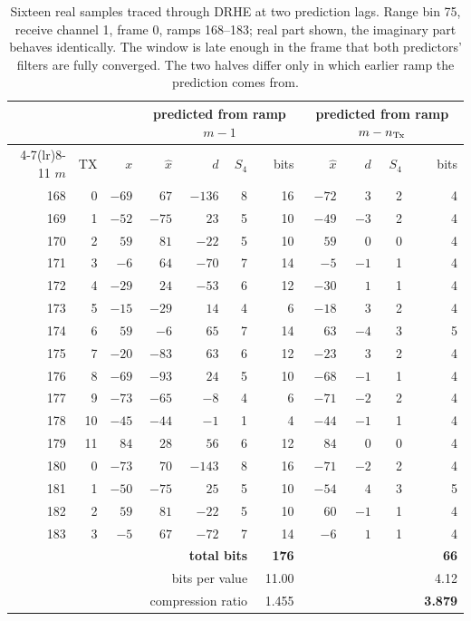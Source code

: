 \begin{table}[htbp]
\centering
\caption[Sixteen samples traced through both predictors]{Sixteen real samples
traced through DRHE at two prediction lags. Range bin 75, receive channel 1,
frame 0, ramps 168--183; real part shown, the imaginary part behaves
identically. The window is late enough in the frame that both predictors'
filters are fully converged. The two halves differ only in which earlier ramp
the prediction comes from.}
\label{tab:worked16}
\small
\setlength{\tabcolsep}{4pt}
\begin{tabular}{@{}rr r@{\hskip 10pt} rrrr @{\hskip 10pt} rrrr@{}}
\toprule
& & & \multicolumn{4}{c}{\textbf{predicted from ramp $m-1$}}
    & \multicolumn{4}{c}{\textbf{predicted from ramp $m-n_{\mathrm{Tx}}$}}\\
\cmidrule(lr){4-7}\cmidrule(lr){8-11}
$m$ & TX & $x$ & $\hat{x}$ & $d$ & $S_4$ & bits & $\hat{x}$ & $d$ & $S_4$ & bits\\
\midrule
168 & 0  & $-69$ & $67$  & $-136$ & 8 & 16 & $-72$ & $3$  & 2 & 4\\
169 & 1  & $-52$ & $-75$ & $23$   & 5 & 10 & $-49$ & $-3$ & 2 & 4\\
170 & 2  & $59$  & $81$  & $-22$  & 5 & 10 & $59$  & $0$  & 0 & 4\\
171 & 3  & $-6$  & $64$  & $-70$  & 7 & 14 & $-5$  & $-1$ & 1 & 4\\
172 & 4  & $-29$ & $24$  & $-53$  & 6 & 12 & $-30$ & $1$  & 1 & 4\\
173 & 5  & $-15$ & $-29$ & $14$   & 4 & 6  & $-18$ & $3$  & 2 & 4\\
174 & 6  & $59$  & $-6$  & $65$   & 7 & 14 & $63$  & $-4$ & 3 & 5\\
175 & 7  & $-20$ & $-83$ & $63$   & 6 & 12 & $-23$ & $3$  & 2 & 4\\
176 & 8  & $-69$ & $-93$ & $24$   & 5 & 10 & $-68$ & $-1$ & 1 & 4\\
177 & 9  & $-73$ & $-65$ & $-8$   & 4 & 6  & $-71$ & $-2$ & 2 & 4\\
178 & 10 & $-45$ & $-44$ & $-1$   & 1 & 4  & $-44$ & $-1$ & 1 & 4\\
179 & 11 & $84$  & $28$  & $56$   & 6 & 12 & $84$  & $0$  & 0 & 4\\
180 & 0  & $-73$ & $70$  & $-143$ & 8 & 16 & $-71$ & $-2$ & 2 & 4\\
181 & 1  & $-50$ & $-75$ & $25$   & 5 & 10 & $-54$ & $4$  & 3 & 5\\
182 & 2  & $59$  & $81$  & $-22$  & 5 & 10 & $60$  & $-1$ & 1 & 4\\
183 & 3  & $-5$  & $67$  & $-72$  & 7 & 14 & $-6$  & $1$  & 1 & 4\\
\midrule
\multicolumn{6}{r}{\textbf{total bits}} & \textbf{176} & & & & \textbf{66}\\
\multicolumn{6}{r}{bits per value} & 11.00 & & & & 4.12\\
\multicolumn{6}{r}{compression ratio} & 1.455 & & & & \textbf{3.879}\\
\bottomrule
\end{tabular}
\end{table}

